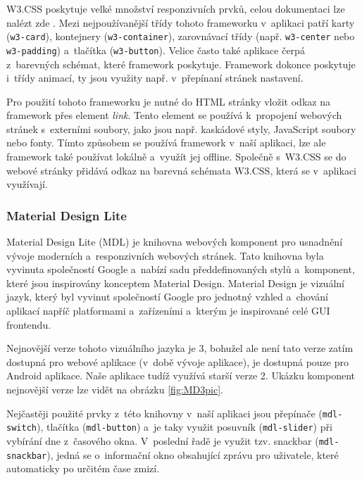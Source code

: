 W3.CSS poskytuje velké množství responzivních prvků, celou dokumentaci lze nalézt zde \cite{w3-css-dokumentace}. Mezi nejpoužívanější třídy tohoto frameworku v~aplikaci patří karty (\texttt{w3-card}), kontejnery \newline(\texttt{w3-container}), zarovnávací třídy (např. \texttt{w3-center} nebo \texttt{w3-padding}) a~tlačítka (\texttt{w3-button}). Velice často také aplikace čerpá z~barevných schémat, které framework poskytuje. Framework dokonce poskytuje i~třídy animací, ty jsou využity např. v~přepínaní stránek nastavení.

Pro použití tohoto frameworku je nutné do HTML stránky vložit odkaz na framework přes element \emph{link}. Tento element se používá k~propojení webových stránek s~externími soubory, jako jsou např. kaskádové styly, JavaScript soubory nebo fonty. Tímto způsobem se používá framework v~naší aplikaci, lze ale framework také používat lokálně a~využít jej offline. Společně s~W3.CSS se do webové stránky přidává odkaz na barevná schémata W3.CSS, která se v~aplikaci využívají.

\subsubsection*{Material Design Lite}

Material Design Lite (MDL) je knihovna webových komponent pro usnadnění vývoje moderních a~responzivních webových stránek. Tato knihovna byla vyvinuta společností Google a~nabízí sadu předdefinovaných stylů a~komponent, které jsou inspirovány konceptem Material Design. Material Design je vizuální jazyk, který byl vyvinut společností Google pro jednotný vzhled a~chování aplikací napříč platformami a~zařízeními \cite{mdl-dokumentace} a~kterým je inspirované celé GUI frontendu.

Nejnovější verze tohoto vizuálního jazyka je 3, bohužel ale není tato verze zatím dostupná pro webové aplikace (v~době vývoje aplikace), je dostupná pouze pro Android aplikace. Naše aplikace tudíž využívá starší verze 2. Ukázku komponent nejnovější verze lze vidět na obrázku \ref{fig:MD3pic}.

Nejčastěji použité prvky z~této knihovny v~naší aplikaci jsou přepínače (\texttt{mdl-switch}), tlačítka (\texttt{mdl-button}) a~je taky využit posuvník (\texttt{mdl-slider}) při vybírání dne z~časového okna. V~poslední řadě je využit tzv. snackbar (\texttt{mdl-snackbar}), jedná se o~informační okno obsahující zprávu pro uživatele, které automaticky po určitém čase zmizí.

